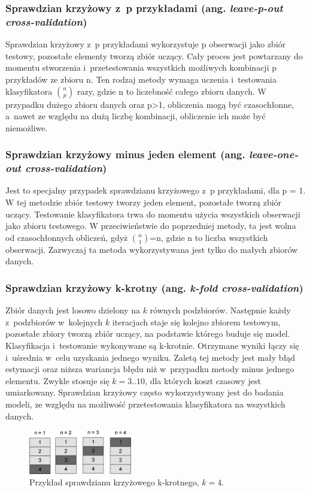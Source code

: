 \subsubsection{Sprawdzian krzyżowy z~p przykładami (ang. \textit{leave-p-out cross-validation})}
Sprawdzian krzyżowy z~p przykładami wykorzystuje p obserwacji jako zbiór testowy, pozostałe elementy tworzą zbiór uczący. Cały proces jest powtarzany do momentu stworzenia i~przetestowania wszystkich możliwych kombinacji p przykładów ze zbioru n. Ten rodzaj metody wymaga uczenia i~testowania klasyfikatora $\binom{n}{p}$ razy, gdzie n to liczebność całego zbioru danych. W przypadku dużego zbioru danych oraz p>1, obliczenia mogą być czasochłonne, a~nawet ze względu na dużą liczbę kombinacji, obliczenie ich może być niemożliwe.

\subsubsection{Sprawdzian krzyżowy minus jeden element (ang. \textit{leave-one-out cross-validation})}
Jest to specjalny przypadek sprawdzianu krzyżowego z~p przykładami, dla p = 1. W tej metodzie zbiór testowy tworzy jeden element, pozostałe tworzą zbiór uczący. Testowanie klasyfikatora trwa do momentu użycia wszystkich obserwacji jako zbioru testowego. W przeciwieństwie do poprzedniej metody, ta jest wolna od czasochłonnych obliczeń, gdyż $\binom{n}{1}$=n, gdzie n to liczba wszystkich obserwacji. Zazwyczaj ta metoda wykorzystywana jest tylko do małych zbiorów danych.

\subsubsection{Sprawdzian krzyżowy k-krotny (ang. \textit{k-fold cross-validation})}
Zbiór danych jest losowo dzielony na $k$ równych podzbiorów. Następnie każdy z~podzbiorów w~kolejnych $k$ iteracjach staje się kolejno zbiorem testowym, pozostałe zbiory tworzą zbiór uczący, na podstawie którego buduje się model. Klasyfikacja i~testowanie wykonywane są k-krotnie. Otrzymane wyniki łączy się i~uśrednia w~celu uzyskania jednego wyniku. Zaletą tej metody jest mały błąd estymacji oraz niższa wariancja błędu niż w~przypadku metody minus jednego elementu. Zwykle stosuje się $k=3..10$, dla których koszt czasowy jest umiarkowany. Sprawdzian krzyżowy często wykorzystywany jest do badania modeli, ze względu na możliwość przetestowania klasyfikatora na wszystkich danych.
\begin{figure}[h]
	\centering
	\includegraphics[width=0.4\textwidth]{./images/crossvalidation.jpg}
	\caption{Przykład sprawdzianu krzyżowego k-krotnego, $k=4$.}
	\label{fig:sprawdziankrzyzowy}
\end{figure}

